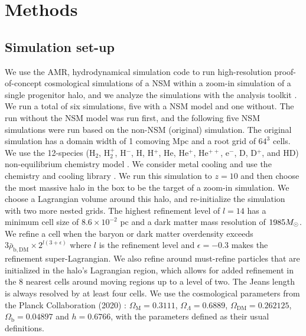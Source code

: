 \documentclass[fleqn,usenatbib]{mnras}
\begin{document}
\section{Methods} \label{sec:methods}

\subsection{Simulation set-up} \label{sec:NSM_simulation}

We use the AMR, hydrodynamical simulation code \enzo{} \citep{Enzo} to run high-resolution proof-of-concept cosmological simulations of a NSM within a zoom-in simulation of a single progenitor halo, and we analyze the simulations with the analysis toolkit \yt{} \citep{yt_full_paper}. We run a total of six simulations, five with a NSM model and one without. The run without the NSM model was run first, and the following five NSM simulations were run based on the non-NSM (original) simulation. The original simulation has a domain width of 1 comoving Mpc and a root grid of $64^{3}$ cells. We use the 12-species (H$_{2}$, H$_{2}^{+}$, H$^{-}$, H, H$^{+}$, He, He$^{+}$, He$^{++}$, e$^{-}$, D, D$^{+}$, and HD) non-equilibrium chemistry model \citep{Abel97, Anninos97}. We consider metal cooling and use the chemistry and cooling library \grackle{} \citep{grackle}. We run this simulation to $z = 10$ and then choose the most massive halo in the box to be the target of a zoom-in simulation. We choose a Lagrangian volume around this halo, and re-initialize the simulation with two more nested grids. The highest refinement level of $l = 14$ has a minimum cell size of $8.6 \times 10^{-2}$ pc and a dark matter mass resolution of $1985 \Ms$. We refine a cell when the baryon or dark matter overdensity exceeds $3 \bar{\rho}_{\mathrm{b, DM}} \times 2^{l (3 + \epsilon)}$ where $l$ is the refinement level and $\epsilon = -0.3$ makes the refinement super-Lagrangian. We also refine around must-refine particles that are initialized in the halo's Lagrangian region, which allows for added refinement in the 8 nearest cells around moving regions up to a level of two. The Jeans length is always resolved by at least four cells. We use the cosmological parameters from the Planck Collaboration (2020) \citep{Planck18_Cosmo}: $\Omega_{\mathrm{M}} = 0.3111$, $\Omega_{\Lambda} = 0.6889$, $\Omega_{\mathrm{DM}} = 0.262125$, $\Omega_{\mathrm{b}} = 0.04897$ and $h = 0.6766$, with the parameters defined as their usual definitions.
\end{document}
